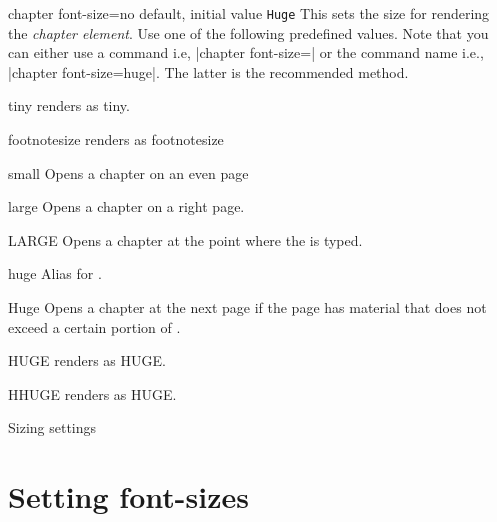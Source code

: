 \begin{docKey}[phd]{chapter font-size}{=}{no default, initial value \texttt{Huge}}
This sets the size for rendering the \textit{chapter element}. Use one of the following predefined values.
Note that you can either use a command i.e, |chapter font-size=|\cmd{\huge} 
or the command name i.e., |chapter font-size=huge|. The latter is the recommended method.
\end{docKey}

\begin{marglist}
\item [tiny] renders as {\tiny tiny}.
\item[footnotesize] renders as {\footnotesize footnotesize}
\item [small] Opens a chapter on an even page
\item [large] Opens a chapter on a right page.
\item [LARGE] Opens a chapter at the point where the  is typed.
\item [huge] Alias for .
\item [Huge] Opens a chapter at the next page if the page has material that does not exceed a certain portion of
 .
 \item[HUGE] renders as {\HUGE HUGE}.
 \item[HHUGE] renders as {\HHUGE HUGE}.
\end{marglist}

\begin{texexample}{Sizing settings}{}
\chapter{Setting font-sizes}          
\lorem

\end{texexample}




